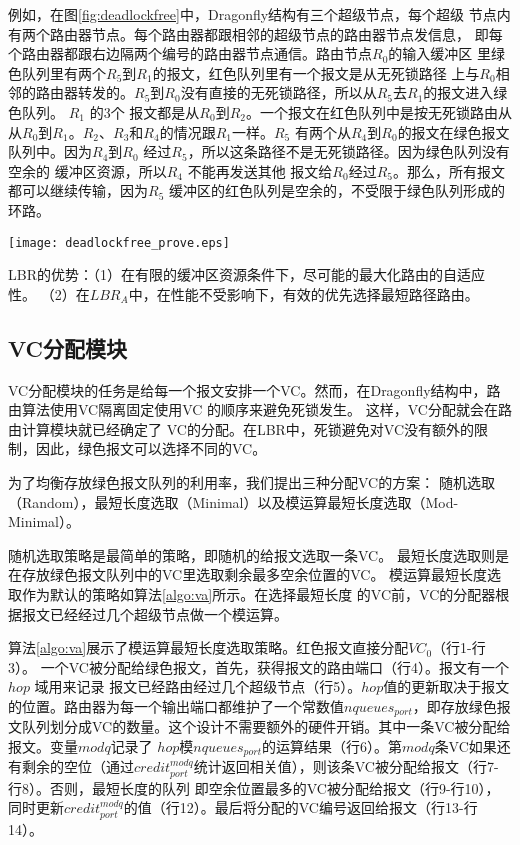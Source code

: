 例如，在图\ref{fig:deadlockfree}中，Dragonfly结构有三个超级节点，每个超级
节点内有两个路由器节点。每个路由器都跟相邻的超级节点的路由器节点发信息，
即每个路由器都跟右边隔两个编号的路由器节点通信。路由节点$R_0$的输入缓冲区
里绿色队列里有两个$R_5$到$R_1$的报文，红色队列里有一个报文是从无死锁路径
上与$R_0$相邻的路由器转发的。$R_5$到$R_0$没有直接的无死锁路径，所以从$R_5$去$R_1$的报文进入绿色队列。 $R_1$ 的3个
报文都是从$R_0$到$R_2$。一个报文在红色队列中是按无死锁路由从
从$R_0$到$R_1$。$R_2$、$R_3$和$R_4$的情况跟$R_1$一样。$R_5$
有两个从$R_4$到$R_0$的报文在绿色报文队列中。因为$R_4$到$R_0$
经过$R_5$，所以这条路径不是无死锁路径。因为绿色队列没有空余的
缓冲区资源，所以$R_4$ 不能再发送其他
报文给$R_0$经过$R_5$。那么，所有报文都可以继续传输，因为$R_5$
缓冲区的红色队列是空余的，不受限于绿色队列形成的环路。

\begin{figure*}[t]
  \centering
  \texttt{[image: deadlockfree\_prove.eps]}
  \caption{Dragonfly的死锁避免机制范例}
  \label{fig:deadlockfree}
\end{figure*}

LBR的优势：（1）在有限的缓冲区资源条件下，尽可能的最大化路由的自适应性。
（2）在$LBR_A$中，在性能不受影响下，有效的优先选择最短路径路由。

\subsection{VC分配模块}


VC分配模块的任务是给每一个报文安排一个VC。然而，在Dragonfly结构中，路由算法使用VC隔离固定使用VC 的顺序来避免死锁发生。
这样，VC分配就会在路由计算模块就已经确定了
VC的分配。在LBR中，死锁避免对VC没有额外的限制，因此，绿色报文可以选择不同的VC。

为了均衡存放绿色报文队列的利用率，我们提出三种分配VC的方案：
随机选取（Random），最短长度选取（Minimal）以及模运算最短长度选取（Mod-Minimal）。

随机选取策略是最简单的策略，即随机的给报文选取一条VC。
最短长度选取则是在存放绿色报文队列中的VC里选取剩余最多空余位置的VC。
模运算最短长度选取作为默认的策略如算法\ref{algo:va}所示。在选择最短长度
的VC前，VC的分配器根据报文已经经过几个超级节点做一个模运算。

算法\ref{algo:va}展示了模运算最短长度选取策略。红色报文直接分配$VC_0$（行1-行3）。
一个VC被分配给绿色报文，首先，获得报文的路由端口（行4）。报文有一个$hop$ 域用来记录
报文已经路由经过几个超级节点（行5）。$hop$值的更新取决于报文的位置。路由器为每一个输出端口都维护了一个常数值$nqueues_{port}$，即存放绿色报文队列划分成VC的数量。这个设计不需要额外的硬件开销。其中一条VC被分配给报文。变量$modq$记录了
$hop$模$nqueues_{port}$的运算结果（行6）。第$modq$条VC如果还有剩余的空位（通过$credit_{port}^{modq}$统计返回相关值），则该条VC被分配给报文（行7- 行8）。否则，最短长度的队列
即空余位置最多的VC被分配给报文（行9-行10），同时更新$credit_{port}^{modq}$的值（行12）。最后将分配的VC编号返回给报文（行13-行14）。

